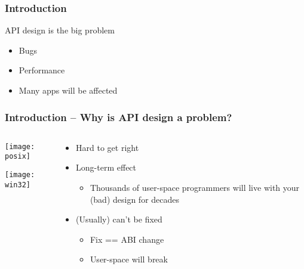 \begin{frame}[plain]
	\frametitle{Introduction}
	
	\begin{center}
		\Huge 
		API design is the big problem				
		\pause
		\normalsize
		\begin{itemize}
			\item Bugs
			\item Performance
			\item Many apps will be affected
		\end{itemize}
		
	\end{center}
	
	
\end{frame}

\begin{frame}[plain]
	\frametitle{Introduction -- Why is API design a problem?}

	\begin{columns}
	
	\begin{column}{.4\textwidth}
		\centering
		\texttt{[image: posix]}
		
		\texttt{[image: win32]}
	\end{column}
	
	\begin{column}{.6\textwidth}
	\large
	\begin{itemize}
	\item Hard to get right
	\item Long-term effect
	\begin{itemize}
		\item Thousands of user-space
		programmers will live with your
		(bad) design for decades
		
	\end{itemize}
	
	\item (Usually) can't be fixed
	\begin{itemize}
		\item Fix == ABI change
		\item User-space will break
		
	\end{itemize}
	\end{itemize}

\end{column}
\end{columns}

\end{frame}


